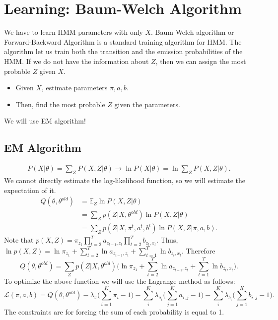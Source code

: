 \section{Learning: Baum-Welch Algorithm}
We have to learn HMM parameters with only $X$. Baum-Welch algorithm or Forward-Backward Algorithm is a standard training algorithm for HMM. The algorithm let us train both the transition and the emission probabilities of the HMM. If we do not have the information about $Z$, then we can assign the most probable $Z$ given $X$.

\begin{itemize}
	\item Given $X$, estimate parameters $\pi, a, b$.
	\item Then, find the most probable $Z$ given the parameters. 
\end{itemize}
We will use EM algorithm!

\subsection{EM Algorithm}
\begin{align*}
	P(X|\theta) = \sum_Z P(X,Z|\theta) \to \ln P(X|\theta) = \ln \sum_Z P(X,Z|\theta).
\end{align*}
We cannot directly estimate the log-likelihood function, so we will estimate the expectation of it. 
\begin{align*}
	Q(\theta, \theta^{old}) &= \mathbb{E}_{Z}\ln P(X,Z|\theta) \\
							&= \sum_Z p(Z|X,\theta^{old})\ln P(X,Z|\theta)\\
							&= \sum_Z p(Z|X,\pi^t, a^t, b^t)\ln P(X,Z|\pi, a, b).
\end{align*}
Note that $p(X,Z) = \pi_{z_{1}}\prod_{t=2}^{T}a_{z_{t-1},z_t}\prod_{t=2}^{T}b_{z_{t},x_t}$. Thus, $\ln p(X,Z) = \ln \pi_{z_{1}}+\sum_{t=2}^{T}\ln a_{z_{t-1},z_t}+\sum_{t=1}^{T}\ln b_{z_{t},x_t}$. Therefore
$$Q(\theta, \theta^{old}) = \sum_Z p(Z|X, \theta^{old}) \bigg(\ln \pi_{z_{1}}+\sum_{t=2}^{T}\ln a_{z_{t-1},z_t}+\sum_{t=1}^{T}\ln b_{z_{t},x_t}\bigg).$$
To optimize the above function we will use the Lagrange method as follows: 
$$\mathcal{L}(\pi, a, b) = Q(\theta, \theta^{old}) - \lambda_\pi \bigg(\sum_{i=1}^K\pi_i-1\bigg) - \sum_i^K\lambda_{a_i} \bigg(\sum_{j=1}^Ka_{i,j}-1\bigg) - \sum_i^K\lambda_{b_i} \bigg(\sum_{j=1}^Kb_{i,j}-1\bigg).$$
The constraints are for forcing the sum of each probability is equal to 1. 

